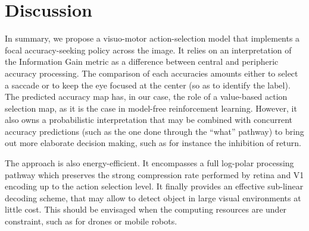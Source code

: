 \section{Discussion}
\label{sec:discussion}

In summary, we propose a visuo-motor action-selection model that implements a focal accuracy-seeking policy across the image. It relies on an interpretation of the Information Gain metric as a difference between central and peripheric accuracy processing.  The comparison of each accuracies amounts either to select  a saccade or to keep the eye focused at the center (so as to identify the label).
The predicted accuracy map has, in our case, the role of a value-based action selection map, as it is the case in model-free reinforcement learning. However, it also owns a probabilistic interpretation that may be combined with concurrent accuracy predictions (such as the one done through the ``what'' pathway) to bring out more elaborate decision making, such as for instance the inhibition of return. 




The approach is also energy-efficient. It encompasses a full log-polar processing pathway which preserves the strong compression rate performed by retina and V1 encoding up to the action selection level. It finally provides an effective sub-linear decoding scheme, that may allow to detect object in large visual environments at little cost. This should be envisaged when the computing resources are under constraint, such as for drones or mobile robots. 



